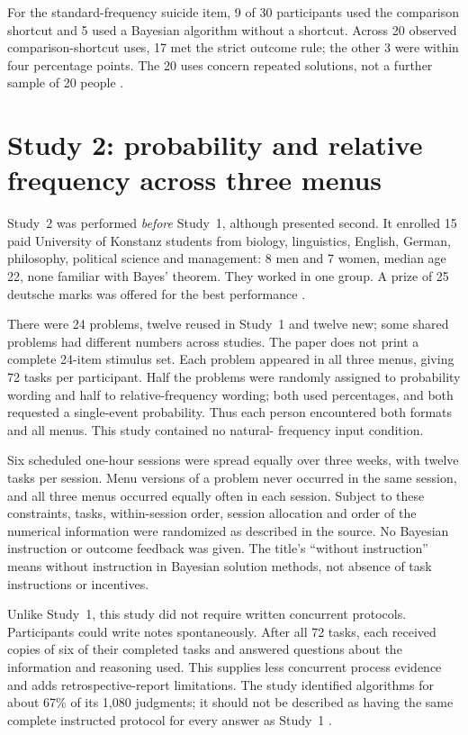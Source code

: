 For the standard-frequency suicide item, 9 of 30 participants used the
comparison shortcut and 5 used a Bayesian algorithm without a shortcut.
Across 20 observed comparison-shortcut uses, 17 met the strict outcome rule;
the other 3 were within four percentage points. The 20 uses concern repeated
solutions, not a further sample of 20 people
\cite[pp.~693--694]{GigerenzerHoffrage1995FrequencyFormats}.

\section{Study 2: probability and relative frequency across three menus}
\label{sec:p19-frequency-study-two}

Study~2 was performed \emph{before} Study~1, although presented second.
It enrolled 15 paid University of Konstanz students from biology, linguistics,
English, German, philosophy, political science and management: 8 men and
7 women, median age 22, none familiar with Bayes' theorem. They worked in
one group. A prize of 25 deutsche marks was offered for the best performance
\cite[pp.~695--696 and note~4]{GigerenzerHoffrage1995FrequencyFormats}.

There were 24 problems, twelve reused in Study~1 and twelve new; some shared
problems had different numbers across studies. The paper does not print a
complete 24-item stimulus set. Each problem appeared in all three menus,
giving 72 tasks per participant. Half the problems were randomly assigned
to probability wording and half to relative-frequency wording; both used
percentages, and both requested a single-event probability. Thus each person
encountered both formats and all menus. This study contained no natural-
frequency input condition.

Six scheduled one-hour sessions were spread equally over three weeks, with
twelve tasks per session. Menu versions of a problem never occurred in the
same session, and all three menus occurred equally often in each session.
Subject to these constraints, tasks, within-session order, session allocation
and order of the numerical information were randomized as described in the
source. No Bayesian instruction or outcome feedback was given. The title's
``without instruction'' means without instruction in Bayesian solution
methods, not absence of task instructions or incentives.

Unlike Study~1, this study did not require written concurrent protocols.
Participants could write notes spontaneously. After all 72 tasks, each
received copies of six of their completed tasks and answered questions about
the information and reasoning used. This supplies less concurrent process
evidence and adds retrospective-report limitations. The study identified
algorithms for about 67\% of its 1,080 judgments; it should not be described
as having the same complete instructed protocol for every answer as Study~1
\cite[p.~696]{GigerenzerHoffrage1995FrequencyFormats}.

